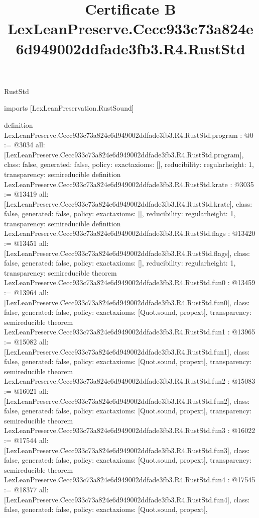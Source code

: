 \begin{lexlean}{RustStd}
\title{Certificate B LexLeanPreserve.Cecc933c73a824e6d949002ddfade3fb3.R4.RustStd}
\begin{coremodule}
imports [LexLeanPreservation.RustSound]

definition LexLeanPreserve.Cecc933c73a824e6d949002ddfade3fb3.R4.RustStd.program : @0 := @3034 {
  all: [LexLeanPreserve.Cecc933c73a824e6d949002ddfade3fb3.R4.RustStd.program],
  class: false,
  generated: false,
  policy: exact{axioms: []},
  reducibility: regular{height: 1},
  transparency: semireducible
}
definition LexLeanPreserve.Cecc933c73a824e6d949002ddfade3fb3.R4.RustStd.krate : @3035 := @13419 {
  all: [LexLeanPreserve.Cecc933c73a824e6d949002ddfade3fb3.R4.RustStd.krate],
  class: false,
  generated: false,
  policy: exact{axioms: []},
  reducibility: regular{height: 1},
  transparency: semireducible
}
definition LexLeanPreserve.Cecc933c73a824e6d949002ddfade3fb3.R4.RustStd.flags : @13420 := @13451 {
  all: [LexLeanPreserve.Cecc933c73a824e6d949002ddfade3fb3.R4.RustStd.flags],
  class: false,
  generated: false,
  policy: exact{axioms: []},
  reducibility: regular{height: 1},
  transparency: semireducible
}
theorem LexLeanPreserve.Cecc933c73a824e6d949002ddfade3fb3.R4.RustStd.fun0 : @13459 := @13964 {
  all: [LexLeanPreserve.Cecc933c73a824e6d949002ddfade3fb3.R4.RustStd.fun0],
  class: false,
  generated: false,
  policy: exact{axioms: [Quot.sound, propext]},
  transparency: semireducible
}
theorem LexLeanPreserve.Cecc933c73a824e6d949002ddfade3fb3.R4.RustStd.fun1 : @13965 := @15082 {
  all: [LexLeanPreserve.Cecc933c73a824e6d949002ddfade3fb3.R4.RustStd.fun1],
  class: false,
  generated: false,
  policy: exact{axioms: [Quot.sound, propext]},
  transparency: semireducible
}
theorem LexLeanPreserve.Cecc933c73a824e6d949002ddfade3fb3.R4.RustStd.fun2 : @15083 := @16021 {
  all: [LexLeanPreserve.Cecc933c73a824e6d949002ddfade3fb3.R4.RustStd.fun2],
  class: false,
  generated: false,
  policy: exact{axioms: [Quot.sound, propext]},
  transparency: semireducible
}
theorem LexLeanPreserve.Cecc933c73a824e6d949002ddfade3fb3.R4.RustStd.fun3 : @16022 := @17544 {
  all: [LexLeanPreserve.Cecc933c73a824e6d949002ddfade3fb3.R4.RustStd.fun3],
  class: false,
  generated: false,
  policy: exact{axioms: [Quot.sound, propext]},
  transparency: semireducible
}
theorem LexLeanPreserve.Cecc933c73a824e6d949002ddfade3fb3.R4.RustStd.fun4 : @17545 := @18377 {
  all: [LexLeanPreserve.Cecc933c73a824e6d949002ddfade3fb3.R4.RustStd.fun4],
  class: false,
  generated: false,
  policy: exact{axioms: [Quot.sound, propext]},
}
\end{coremodule}
\end{lexlean}
